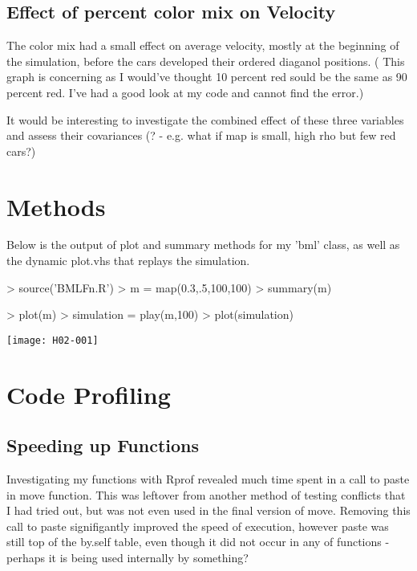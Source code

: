 \documentclass[12pt]{article}
\begin{document}
		\subsection{Effect of percent color mix on Velocity}
			The color mix had a small effect on average velocity, mostly at the beginning of the simulation, before the cars developed their ordered diaganol positions. ( This graph is concerning as I would've thought 10 percent red sould be the same as 90 percent red. I've had a good look at my code and cannot find the error.)

			It would be interesting to investigate the combined effect of these three variables and assess their covariances (? - e.g. what if map is small, high rho but few red cars?)
			
	\clearpage
	\section{Methods}
		Below is the output of plot and summary methods for my 'bml' class, as well as the dynamic plot.vhs that replays the simulation.
\begin{Schunk}
\begin{Sinput}
> source('BMLFn.R')
> m = map(0.3,.5,100,100)
> summary(m)
\end{Sinput}
\begin{Sinput}
> plot(m)
> simulation = play(m,100)
> plot(simulation)
\end{Sinput}
\end{Schunk}
\texttt{[image: H02-001]}
\clearpage

	\section{Code Profiling}
		\subsection{Speeding up Functions}
		Investigating my functions with Rprof revealed much time spent in a call to paste in move function. This was leftover from another method of testing conflicts that I had tried out, but was not even used in the final version of move. Removing this call to paste signifigantly improved the speed of execution, however paste was still top of the by.self table, even though it did not occur in any of functions - perhaps it is being used internally by something?
\end{document}
